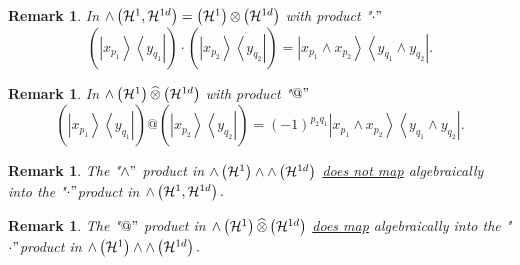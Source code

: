 \documentclass[aps,preprint]{revtex4}%
\newtheorem{remark}[theorem]{Remark}
\begin{document}
\begin{remark}
In ${\huge \wedge}\left(  \mathcal{H}^{1},\mathcal{H}^{1d}\right)  =\left(
\mathcal{H}^{1}\right)  {\normalsize \otimes}\left(  \mathcal{H}^{1d}\right)
$ with product "$\cdot"$%
\begin{equation}
\left(  \overset{}{\left\vert x_{p_{1}}\right\rangle \left\langle y_{q_{1}%
}\right\vert }\right)  \cdot\left(  \overset{}{\left\vert x_{p_{2}%
}\right\rangle \left\langle y_{q_{2}}\right\vert }\right)  =\left\vert
x_{p_{1}}\wedge x_{p_{2}}\right\rangle \left\langle y_{q_{1}}\wedge y_{q_{2}%
}\right\vert .
\end{equation}

\end{remark}

\begin{remark}
In ${\huge \wedge}\left(  \mathcal{H}^{1}\right)
\widehat{{\normalsize \otimes}}\left(  \mathcal{H}^{1d}\right)  $ with product
"$@"$%
\begin{equation}
\left(  \overset{}{\left\vert x_{p_{1}}\right\rangle \left\langle y_{q_{1}%
}\right\vert }\right)  @\left(  \overset{}{\left\vert x_{p_{2}}\right\rangle
\left\langle y_{q_{2}}\right\vert }\right)  =\left(  -1\right)  ^{p_{2}q_{1}%
}\left\vert x_{p_{1}}\wedge x_{p_{2}}\right\rangle \left\langle y_{q_{1}%
}\wedge y_{q_{2}}\right\vert .
\end{equation}

\end{remark}

\begin{remark}
The "$\wedge"$ product in ${\huge \wedge}\left(  \mathcal{H}^{1}\right)
\wedge{\huge \wedge}\left(  \mathcal{H}^{1d}\right)  $ \underline{\emph{does
not map}}\emph{ algebraically} into the "$\cdot"$product in ${\huge \wedge
}\left(  \mathcal{H}^{1},\mathcal{H}^{1d}\right)  .$
\end{remark}

\begin{remark}
The "$@"$ product in ${\huge \wedge}\left(  \mathcal{H}^{1}\right)
\widehat{{\normalsize \otimes}}\left(  \mathcal{H}^{1d}\right)  $
\underline{\emph{does map}}\emph{ algebraically} into the "$\cdot"$product in
${\huge \wedge}\left(  \mathcal{H}^{1}\right)  \wedge{\huge \wedge}\left(
\mathcal{H}^{1d}\right)  .$
\end{remark}
\end{document}
